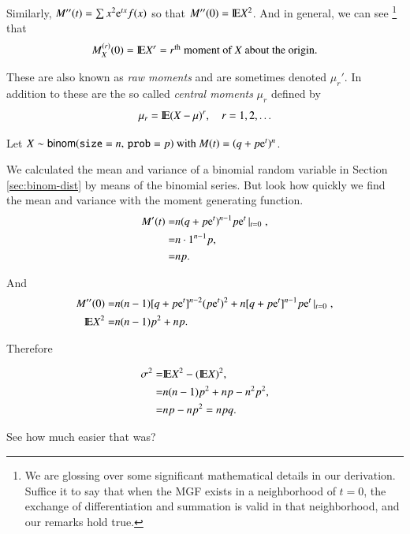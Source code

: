 \documentclass[captions=tableheading]{scrbook}
\begin{document}
Similarly, \(M''(t)=\sum x^{2}\mathrm{e}^{tx}f(x)\) so that \(M''(0)=\mathrm{I\hspace{-1.5pt}E} X^{2}\). And in general, we can see
\footnote{We are glossing over some significant mathematical details in our derivation. Suffice it to say that when the MGF exists in a neighborhood of \(t=0\), the exchange of differentiation and summation is valid in that neighborhood, and our remarks hold true.}
that
\begin{equation}
M_{X}^{(r)}(0)=\mathrm{I\hspace{-1.5pt}E} X^{r}=\mbox{\ensuremath{r^{\mathrm{th}}} moment of \ensuremath{X} about the origin.}
\end{equation}

These are also known as \emph{raw moments} and are sometimes denoted \(\mu_{r}'\). In addition to these are the so called \emph{central moments} \(\mu_{r}\) defined by
\begin{equation}
\mu_{r}=\mathrm{I\hspace{-1.5pt}E}(X-\mu)^{r},\quad r=1,2,\ldots
\end{equation}

\begin{example}
Let \(X\sim\mathsf{binom}(\mathtt{size}=n,\,\mathtt{prob}=p)\mbox{ with \ensuremath{M(t)=(q+p\mathrm{e}^{t})^{n}}}\).

We calculated the mean and variance of a binomial random variable in Section \ref{sec:binom-dist} by means of the binomial series. But look how quickly we find the mean and variance with the moment generating function.
\begin{alignat*}{1}
M'(t)= & n(q+p\mathrm{e}^{t})^{n-1}p\mathrm{e}^{t}\left|_{t=0}\right.,\\
= & n\cdot1^{n-1}p,\\
= & np.
\end{alignat*}

And
\begin{alignat*}{1}
M''(0)= & n(n-1)[q+p\mathrm{e}^{t}]^{n-2}(p\mathrm{e}^{t})^{2}+n[q+p\mathrm{e}^{t}]^{n-1}p\mathrm{e}^{t}\left|_{t=0}\right.,\\
\mathrm{I\hspace{-1.5pt}E} X^{2}= & n(n-1)p^{2}+np.
\end{alignat*}

Therefore

\begin{alignat*}{1}
\sigma^{2}= & \mathrm{I\hspace{-1.5pt}E} X^{2}-(\mathrm{I\hspace{-1.5pt}E} X)^{2},\\
= & n(n-1)p^{2}+np-n^{2}p^{2},\\
= & np-np^{2}=npq.
\end{alignat*}

See how much easier that was?
\end{example}
\end{document}
